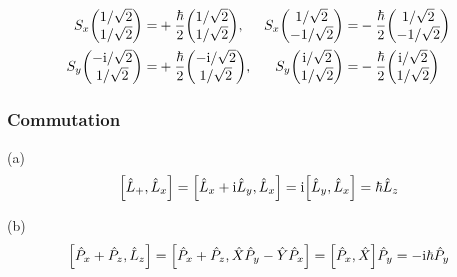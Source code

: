 \begin{align*}
    S_x \mqty(1 / \sqrt{2}      \\ 1 / \sqrt{2}) = & + \frac{\hbar}{2} \mqty(1 / \sqrt{2} \\ 1 / \sqrt{2}), & S_x \mqty(1 / \sqrt{2} \\ - 1 / \sqrt{2}) = & - \frac{\hbar}{2} \mqty(1 / \sqrt{2} \\ - 1 / \sqrt{2})\\
    S_y \mqty(- \rmi / \sqrt{2} \\ 1 / \sqrt{2}) = & + \frac{\hbar}{2} \mqty(- \rmi / \sqrt{2} \\ 1 / \sqrt{2}), & S_y \mqty(\rmi / \sqrt{2} \\ 1 / \sqrt{2}) = & - \frac{\hbar}{2} \mqty(\rmi / \sqrt{2} \\ 1 / \sqrt{2})
\end{align*}

\subsubsection{Commutation}

(a)
\[
    \qty[\hat{L}_+, \hat{L}_x] = \qty[\hat{L}_x + \mathrm{i} \hat{L}_y, \hat{L}_x] = \mathrm{i} \qty[\hat{L}_y, \hat{L}_x] = \hbar \hat{L}_z
\]

(b)
\[
    \qty[\hat{P}_x + \hat{P}_z, \hat{L}_z] = \qty[\hat{P}_x + \hat{P}_z, \hat{X} \hat{P}_y - \hat{Y} \hat{P}_x] = \qty[\hat{P}_x, \hat{X}] \hat{P}_y = - \mathrm{i} \hbar \hat{P}_y
\]